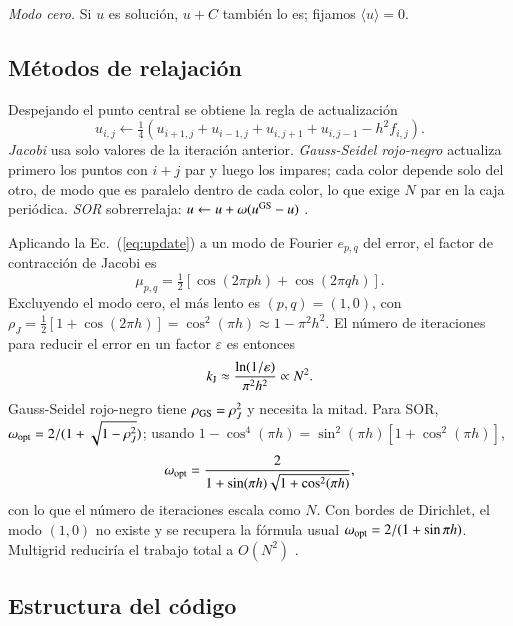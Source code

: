 \documentclass{aa}
\begin{document}
\emph{Modo cero.} Si $u$ es solución, $u+C$ también lo es; fijamos $\langle u\rangle=0$.

\subsection{Métodos de relajación}

Despejando el punto central se obtiene la regla de actualización
\begin{equation}
  u_{i,j} \leftarrow \tfrac14\left(u_{i+1,j}+u_{i-1,j}+u_{i,j+1}+u_{i,j-1}-h^2f_{i,j}\right).
  \label{eq:update}
\end{equation}
\emph{Jacobi} usa solo valores de la iteración anterior. \emph{Gauss-Seidel rojo-negro} actualiza primero los puntos con $i+j$ par y luego los impares; cada color depende solo del otro, de modo que es paralelo dentro de cada color, lo que exige $N$ par en la caja periódica. \emph{SOR} sobrerrelaja: $u\leftarrow u+\omega(u^{\rm GS}-u)$ \citep{Press2007}.

Aplicando la Ec.~(\ref{eq:update}) a un modo de Fourier $e_{p,q}$ del error, el factor de contracción de Jacobi es
\begin{equation}
  \mu_{p,q} = \tfrac12\left[\cos(2\pi ph)+\cos(2\pi qh)\right].
\end{equation}
Excluyendo el modo cero, el más lento es $(p,q)=(1,0)$, con $\rho_J=\tfrac12[1+\cos(2\pi h)]=\cos^2(\pi h)\approx1-\pi^2h^2$. El número de iteraciones para reducir el error en un factor $\varepsilon$ es entonces
\begin{equation}
  k_{\rm J} \approx \frac{\ln(1/\varepsilon)}{\pi^2h^2}\propto N^2 .
  \label{eq:kjacobi}
\end{equation}
Gauss-Seidel rojo-negro tiene $\rho_{\rm GS}=\rho_J^2$ y necesita la mitad. Para SOR, $\omega_{\rm opt}=2/(1+\sqrt{1-\rho_J^2})$; usando $1-\cos^4(\pi h)=\sin^2(\pi h)[1+\cos^2(\pi h)]$,
\begin{equation}
  \omega_{\rm opt} = \frac{2}{1+\sin(\pi h)\sqrt{1+\cos^2(\pi h)}},
  \label{eq:omega}
\end{equation}
con lo que el número de iteraciones escala como $N$. Con bordes de Dirichlet, el modo $(1,0)$ no existe y se recupera la fórmula usual $\omega_{\rm opt}=2/(1+\sin\pi h)$. Multigrid reduciría el trabajo total a $O(N^2)$ \citep{Briggs2000}.

\subsection{Estructura del código}
\end{document}
